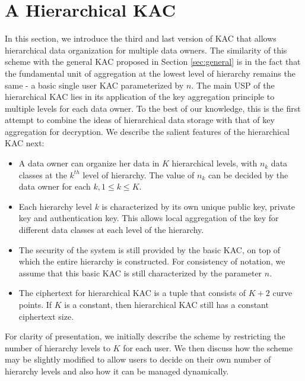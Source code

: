 \section{A Hierarchical KAC}
\label{sec:hierarchical}


In this section, we introduce the third and last version of KAC that allows hierarchical data organization for multiple data owners. The similarity of this scheme with the general KAC proposed in Section \ref{sec:general} is in the fact that the fundamental unit of aggregation at the lowest level of hierarchy remains the same - a basic single user KAC parameterized by $n$. The main USP of the hierarchical KAC lies in its application of the key aggregation principle to multiple levels for each data owner. To the best of our knowledge, this is the first attempt to combine the ideas of hierarchical data storage with that of key aggregation for decryption.  We describe the salient features of the hierarchical KAC next:

\begin{itemize}
 \item A data owner can organize her data in $K$ hierarchical levels, with $n_k$ data classes at the $k^{th}$ level of hierarchy. The value of $n_k$ can be decided by the data owner for each $k, 1\leq k \leq K$. 
 
 \item Each hierarchy level $k$ is characterized by its own unique public key, private key and authentication key. This allows local aggregation of the key for different data classes at each level of the hierarchy.
 
 \item The security of the system is still provided by the basic KAC, on top of which the entire hierarchy is constructed. For consistency of notation, we assume that this basic KAC is still characterized by the parameter $n$.
 
 \item The ciphertext for hierarchical KAC is a tuple that consists of $K+2$ curve points. If $K$ is a constant, then hierarchical KAC still has a constant ciphertext size.  
 
\end{itemize}

For clarity of presentation, we initially describe the scheme by restricting the number of hierarchy levels to $K$ for each user. We then discuss how the scheme may be slightly modified to allow users to decide on their own number of hierarchy levels and also how it can be managed dynamically.

